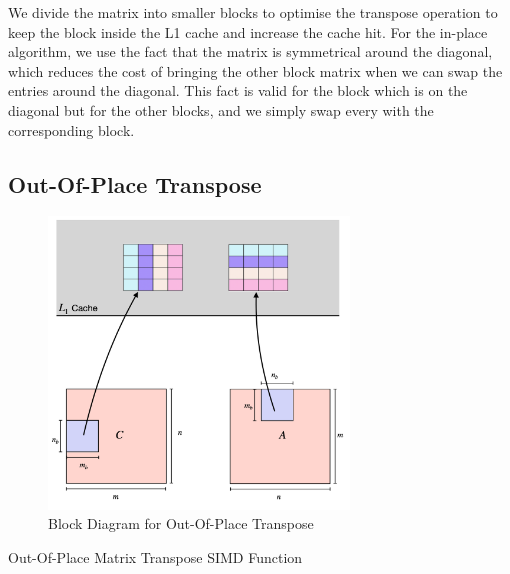 We divide the matrix into smaller blocks to optimise the transpose 
operation to keep the block inside the L1 cache and increase the 
cache hit. For the in-place algorithm, we use the fact that the 
matrix is symmetrical around the diagonal, which reduces the cost 
of bringing the other block matrix when we can swap the entries 
around the diagonal. This fact is valid for the block which is 
on the diagonal but for the other blocks, and we simply swap 
every with the corresponding block.

\subsection{Out-Of-Place Transpose}

\begin{figure}[htb]
    \centering
    \caption*{Block Diagram for Out-Of-Place Transpose}
    \includegraphics[width=8cm]{../assets/transpose/outplace/outplace_trans.png}%
\end{figure}

\begin{algorithm}[H]
    \SetAlgoLined

    \caption{Out-Of-Place Matrix Transpose SIMD Function}
\end{algorithm}


